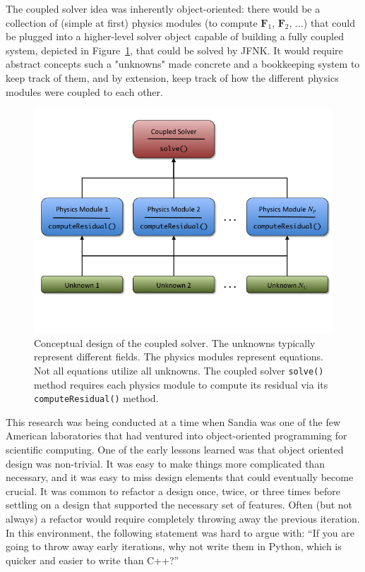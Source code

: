 \documentclass[11pt]{article}
\begin{document}
The coupled solver idea was inherently object-oriented: there would be a collection of (simple at first) physics modules (to compute $\mathbf F_1$, $\mathbf F_2$, $\ldots$) that could be plugged into a higher-level solver object capable of building a fully coupled system, depicted in Figure~\ref{fig:CoupledSolver}, that could be solved by JFNK.  It would require abstract concepts such a "unknowns" made concrete and a bookkeeping system to keep track of them, and by extension, keep track of how the different physics modules were coupled to each other.

\begin{figure}
  \begin{center}
    \includegraphics[width=5.5in]{CoupledSolver}
    \caption{Conceptual design of the coupled solver.  The unknowns typically represent different fields.  The physics modules represent equations.  Not all equations utilize all unknowns.  The coupled solver {\tt solve()} method requires each physics module to compute its residual via its {\tt computeResidual()} method.}
    \label{fig:CoupledSolver}
  \end{center}
\end{figure}

This research was being conducted at a time when Sandia was one of the few American laboratories that had ventured into object-oriented programming for scientific computing.  One of the early lessons learned was that object oriented design was non-trivial.  It was easy to make things more complicated than necessary, and it was easy to miss design elements that could eventually become crucial.  It was common to refactor a design once, twice, or three times before settling on a design that supported the necessary set of features.  Often (but not always) a refactor would require completely throwing away the previous iteration.  In this environment, the following statement was hard to argue with: ``If you are going to throw away early iterations, why not write them in Python, which is quicker and easier to write than C++?''
\end{document}
